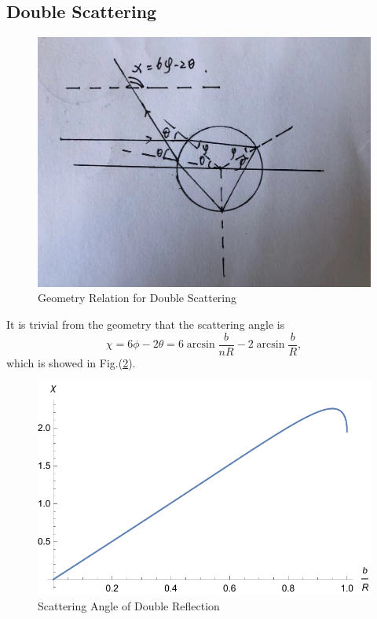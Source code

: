 \documentclass[%
 reprint,
 amsmath,amssymb,
 aps,
]{revtex4-1}
\begin{document}
\subsection{Double Scattering}
\begin{figure}
    \centering
    \includegraphics[scale=0.2]{geometryrelationdouble.jpg}
    \caption{Geometry Relation for Double Scattering}
    \label{fig:my_label}
\end{figure}
It is trivial from the geometry that the scattering angle is
\begin{equation}
    \chi=6\phi-2\theta=6\arcsin{\frac{b}{nR}}-2\arcsin{\frac{b}{R}},
\end{equation}
which is showed in Fig.(\ref{doubelangle}).
\begin{figure}
    \centering
    \includegraphics[scale=0.6]{scatteringanlgeofdouble.pdf}
    \caption{Scattering Angle of Double Reflection}
    \label{doubelangle}
\end{figure}
\end{document}

